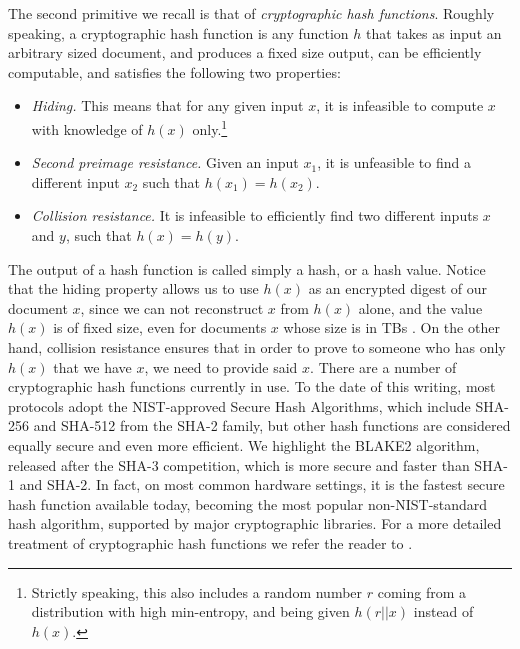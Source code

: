 The second primitive we recall is that of {\em cryptographic hash functions}. Roughly speaking, a cryptographic hash function is any function $h$ that takes as input an arbitrary sized document, and produces a fixed size output, can be efficiently computable, and satisfies the following two properties:
\begin{itemize}
\item {\em Hiding.} This means that for any given input $x$, it is infeasible to compute $x$ with knowledge of $h(x)$ only.\footnote{Strictly speaking, this also includes a random number $r$ coming from a distribution with high min-entropy, and being given $h(r||x)$ instead of $h(x)$.}
\item {\em Second preimage resistance.} Given an input $x_1$, it is unfeasible to find a different input $x_2$ such that $h(x_1)=h(x_2)$.
\item {\em Collision resistance.} It is infeasible to efficiently find two different inputs $x$ and $y$, such that $h(x)=h(y)$.
\end{itemize}
The output of a hash function is called simply a hash, or a hash value. Notice that the hiding property allows us to use $h(x)$ as an encrypted digest of our document $x$, since we can not reconstruct $x$ from $h(x)$ alone, and the value $h(x)$ is of fixed size, even for documents $x$ whose size is in TBs . On the other hand, collision resistance ensures that in order to prove to someone who has only $h(x)$ that we have $x$, we need to provide said $x$. There are a number of cryptographic hash functions currently in use. To the date of this writing, most protocols adopt the NIST-approved Secure Hash Algorithms\cite{sha_standard}, which include SHA-256 and SHA-512 from the SHA-2 family, but other hash functions are considered equally secure and even more efficient. We highlight the BLAKE2 algorithm, released after the SHA-3 competition, which is more secure and faster than SHA-1 and SHA-2. In fact, on most common hardware settings, it is the fastest secure hash function available today, becoming the most popular non-NIST-standard hash algorithm, supported by major cryptographic libraries. For a more detailed treatment of cryptographic hash functions we refer the reader to \cite{sha_standard,aumasson,sha3zoo,bitcoinbook}. 

